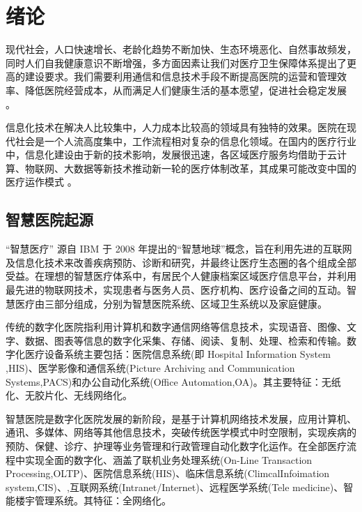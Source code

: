 \documentclass[doctor,secret]{thuthesis}
\begin{document}

\mainmatter
\chapter{绪论}
\label{sec:org2a308e2}
现代社会，人口快速增长、老龄化趋势不断加快、生态环境恶化、自然事故频发，同时人们自我健康意识不断增强，多方面因素让我们对医疗卫生保障体系提出了更高的建设要求。我们需要利用通信和信息技术手段不断提高医院的运营和管理效率、降低医院经营成本，从而满足人们健康生活的基本愿望，促进社会稳定发展 \cite{__2011,__2011-1,__2016-11,__2016-10}。

信息化技术在解决人比较集中，人力成本比较高的领域具有独特的效果。医院在现代社会是一个人流高度集中，工作流程相对复杂的信息化领域。在国内的医疗行业中，信息化建设由于新的技术影响，发展很迅速，各区域医疗服务均借助于云计算、物联网、大数据等新技术推动新一轮的医疗体制改革，其成果可能改变中国的医疗运作模式 \cite{__2016-6,__2016-5,__2016-4,__2016-3,__2015-21,__2015-20,__2015-19,__2015-18}。
\section{智慧医院起源}
\label{sec:org37bf885}
“智慧医疗” \cite{__2012,__2016-4,__2013-2} 源自 IBM 于 2008 年提出的“智慧地球”概念，旨在利用先进的互联网及信息化技术来改善疾病预防、诊断和研究，并最终让医疗生态圈的各个组成全部受益。在理想的智慧医疗体系中，有居民个人健康档案区域医疗信息平台，并利用最先进的物联网技术，实现患者与医务人员、医疗机构、医疗设备之间的互动。智慧医疗由三部分组成，分别为智慧医院系统、区域卫生系统以及家庭健康。

传统的数字化医院指利用计算机和数字通信网络等信息技术，实现语音、图像、文字、数据、图表等信息的数字化采集、存储、阅读、复制、处理、检索和传输。数字化医疗设备系统主要包括：医院信息系统(即 Hospital Information System ,HIS)、医学影像和通信系统(Picture Archiving and Communication Systems,PACS)和办公自动化系统(Office Automation,OA)。其主要特征：无纸化、无胶片化、无线网络化。

智慧医院是数字化医院发展的新阶段，是基于计算机网络技术发展，应用计算机、通讯、多媒体、网络等其他信息技术，突破传统医学模式中时空限制，实现疾病的预防、保健、诊疗、护理等业务管理和行政管理自动化数字化运作。在全部医疗流程中实现全面的数字化、涵盖了联机业务处理系统(On-Line Transaction Processing,OLTP)、医院信息系统(HIS)、临床信息系统(ClimcalInfoimation system,CIS)、,互联网系统(Intranet/Internet)、远程医学系统(Tele medicine)、智能楼宇管理系统。其特征：全网络化。
\end{document}
